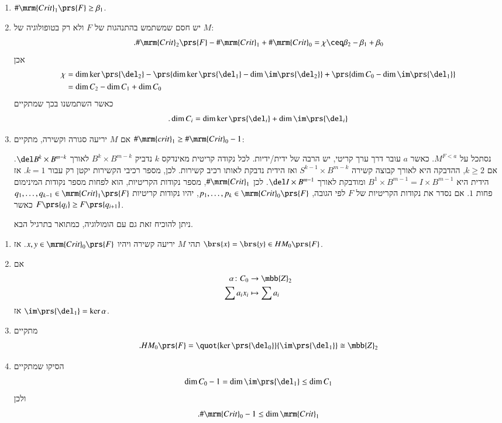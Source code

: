 \documentclass[a4paper,10pt,twoside,openany]{book}
\begin{document}
\begin{enumerate}
\item $\# \mrm{Crit}_1\prs{F} \geq \beta_1$.

\item יש חסם שמשתמש בהתנהגות של
$F$
ולא רק בטופולוגיה של
$M$:
\[\text{.} \# \mrm{Crit}_2\prs{F} - \# \mrm{Crit}_1 + \# \mrm{Crit}_0 = \chi \ceq \beta_2 - \beta_1 + \beta_0\]
אכן
\begin{align*}
\chi &= \dim \ker \prs{\del_2} - \prs{\dim \ker\prs{\del_1} - \dim \im \prs{\del_2}} + \prs{\dim C_0 - \dim \im\prs{\del_1}}
\\&= \dim C_2 - \dim C_1 + \dim C_0
\end{align*}
כאשר השתמשנו בכך שמתקיים
\[\text{.} \dim C_i = \dim \ker \prs{\del_i} + \dim \im\prs{\del_i}\]

\item אם
$M$
יריעה סגורה וקשירה, מתקיים
$\# \mrm{crit}_1 \geq \# \mrm{Crit}_0 - 1$:

נסתכל על
$M^{F < a}$.
כאשר
$a$
עובר דרך ערך קריטי, יש הרבה של ידית/ידיות. לכל נקודה קריטית מאינדקס
$k$
נדביק
$B^k \times B^{m-k}$
לאורך
$\del B^k \times B^{m-k}$.
אם
$k \geq 2$,
ההדבקה היא לאורך קבוצה קשירה
$S^{k-1} \times B^{m-k}$
ואז הידית נדבקת לאותו רכיב קשירות.
לכן, מספר רכיבי הקשירות יקטן רק עבור
$k = 1$.
אז הידית היא
$B^1 \times B^{m-1} = I \times B^{m-1}$
ומודבקת לאורך
$\del I \times B^{m-1}$.
לכן
$\# \mrm{Crit}_1$,
מספר נקודות הקריטיות, הוא לפחות מספר נקודות המינימום פחות
$1$.
אם נסדר את נקודות הקריטיות של
$F$
לפי הגובה,
$p_1, \ldots, p_k \in \mrm{Crit}_0\prs{F}$,
יהיו נקודות קריטיות
$q_1, \ldots, q_{k-1} \in \mrm{Crit}_1\prs{F}$
כאשר
$F\prs{q_i} \geq F\prs{q_{i+1}}$.

ניתן להוכיח זאת גם עם הומולוגיה, כמתואר בתרגיל הבא.
\end{enumerate}

\begin{exercise}
\begin{enumerate}
\item תהי
$M$
יריעה קשירה ויהיו
$x, y \in \mrm{Crit}_0\prs{F}$.
אז
$\brs{x} = \brs{y} \in HM_0\prs{F}$.

\item אם
\begin{align*}
\alpha \colon C_0 &\to \mbb{Z}_2 \\
\sum a_i x_i &\mapsto \sum a_i
\end{align*}
אז
$\im \prs{\del_1} = \ker \alpha$.

\item מתקיים
\[\text{.} H M_0\prs{F} = \quot{\ker\prs{\del_0}}{\im\prs{\del_1}} \cong \mbb{Z}_2\]

\item הסיקו שמתקיים
\[\dim C_0 - 1 = \dim \im\prs{\del_1} \leq \dim C_1\]
ולכן
\[\text{.} \# \mrm{Crit}_0 - 1 \leq \dim \mrm{Crit}_1\]
\end{enumerate}
\end{exercise}
\end{document}
